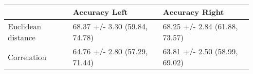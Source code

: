 \begin{tabular}{lll}
\toprule
{} &                  Accuracy Left &                 Accuracy Right \\
\midrule
Euclidean distance &  68.37 +/- 3.30 (59.84, 74.78) &  68.25 +/- 2.84 (61.88, 73.57) \\
Correlation        &  64.76 +/- 2.80 (57.29, 71.44) &  63.81 +/- 2.50 (58.99, 69.02) \\
\bottomrule
\end{tabular}
